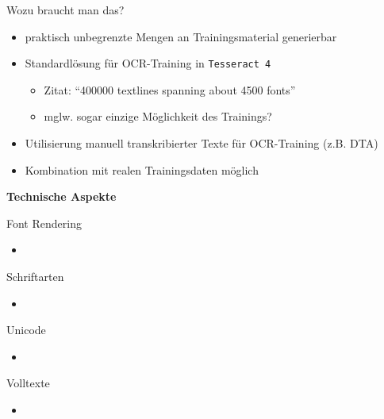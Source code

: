 \documentclass{bbawslides}
\begin{document}
\begin{bbawslide}{Wozu braucht man das?}
  \vspace*{7mm}%
  \centerslidestrue%
  \begin{itemize}
    \item praktisch unbegrenzte Mengen an Trainingsmaterial generierbar
    \item Standardlösung für OCR-Training in \texttt{Tesseract 4}
    \begin{itemize}\small
       \item Zitat: \enquote{400000 textlines spanning about 4500 fonts}
       \item mglw. sogar einzige Möglichkeit des Trainings?
    \end{itemize}
    \item Utilisierung manuell transkribierter Texte für OCR-Training (z.B. DTA)
    \item Kombination mit realen Trainingsdaten möglich
  \end{itemize}
\end{bbawslide}

\begin{bbawpart}{\Large\bf Technische Aspekte}
\end{bbawpart}

\begin{bbawslide}{Font Rendering}
  \vspace*{7mm}%
  \centerslidestrue%
  \begin{itemize}
    \item
  \end{itemize}
\end{bbawslide}

\begin{bbawslide}{Schriftarten}
  \vspace*{7mm}%
  \centerslidestrue%
  \begin{itemize}
    \item
  \end{itemize}
\end{bbawslide}

\begin{bbawslide}{Unicode}
  \vspace*{7mm}%
  \centerslidestrue%
  \begin{itemize}
    \item
  \end{itemize}
\end{bbawslide}

\begin{bbawslide}{Volltexte}
  \vspace*{7mm}%
  \centerslidestrue%
  \begin{itemize}
    \item
  \end{itemize}
\end{bbawslide}
\end{document}
